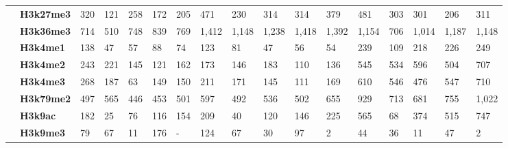 \begin{sidewaystable}[!ht]
\begin{tabular}{ll|lllll|lllll|lllll}
                  & \textbf{H3k27me3} & 320              & 121             & 258             & 172            & 205           & 471              & 230             & 314             & 314            & 379           & 481              & 303             & 301             & 206            & 311           \\
                  & \textbf{H3k36me3} & 714              & 510             & 748             & 839            & 769           & 1,412            & 1,148           & 1,238           & 1,418          & 1,392         & 1,154            & 706             & 1,014           & 1,187          & 1,148         \\
                  & \textbf{H3k4me1}  & 138              & 47              & 57              & 88             & 74            & 123              & 81              & 47              & 56             & 54            & 239              & 109             & 218             & 226            & 249           \\
                  & \textbf{H3k4me2}  & 243              & 221             & 145             & 121            & 162           & 173              & 146             & 183             & 110            & 136           & 545              & 534             & 596             & 504            & 707           \\
                  & \textbf{H3k4me3}  & 268              & 187             & 63              & 149            & 150           & 211              & 171             & 145             & 111            & 169           & 610              & 546             & 476             & 547            & 710           \\
                  & \textbf{H3k79me2} & 497              & 565             & 446             & 453            & 501           & 597              & 492             & 536             & 502            & 655           & 929              & 713             & 681             & 755            & 1,022         \\
                  & \textbf{H3k9ac}   & 182              & 25              & 76              & 116            & 154           & 209              & 40              & 120             & 146            & 225           & 565              & 68              & 374             & 515            & 747           \\
                  & \textbf{H3k9me3}  & 79               & 67              & 11              & 176            & -             & 124              & 67              & 30              & 97             & 2             & 44               & 36              & 11              & 47             & 2             \\

\end{tabular}
\end{sidewaystable}
